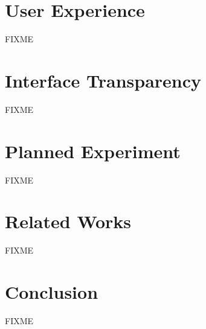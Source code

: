 \documentclass{acm_proc_article-sp}
\begin{document}
\section{User Experience}
FIXME


\section{Interface Transparency}
FIXME



\section{Planned Experiment}
FIXME


\section{Related Works}
FIXME


\section{Conclusion}
FIXME




\end{document}
